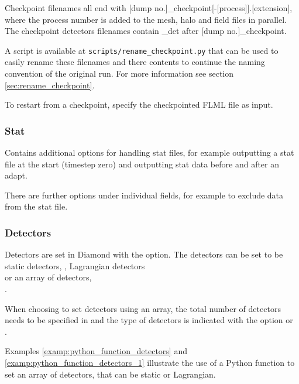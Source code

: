 Checkpoint filenames all end with [dump
no.]\_checkpoint[-[process]].[extension], where the process number is added
to the mesh, halo and field files in parallel.  The checkpoint detectors
filenames contain \_det after [dump no.]\_checkpoint.

A script is available at \lstinline[language = bash]+scripts/rename_checkpoint.py+
that can be used to easily rename these filenames and there contents to continue
the naming convention of the original run. For more information see section
\ref{sec:rename_checkpoint}.

To restart from a checkpoint, specify the checkpointed FLML file as input.

\subsubsection{Stat}
Contains additional options for handling stat files, for example outputting
a stat file at the start (timestep zero) and outputting stat data before and
after an adapt.

There are further options under individual fields, for example to exclude data from the stat file.

\subsubsection{Detectors}
\label{detectors_options}

Detectors are set in Diamond with the  option. The detectors can be set to be static detectors, , Lagrangian detectors \\
 or an array of detectors, \\
.

When choosing to set detectors using an array, the total number of detectors
needs to be specified in
 and the type of
detectors is indicated with the option
 or \\
.

Examples \ref{examp:python_function_detectors} and
\ref{examp:python_function_detectors_1} illustrate the use of a Python
function to set an array of detectors, that can be static or Lagrangian.

